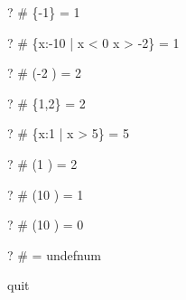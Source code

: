 \begin{zed} \vdash?  \# \{-1\} = 1 \end{zed}
\begin{zed} \vdash?  \# \{x:-10  | x < 0 \land x > -2\} = 1 \end{zed}
\begin{zed} \vdash?  \# (-2 ) = 2 \end{zed}

\begin{zed} \vdash?  \# \{1,2\} = 2 \end{zed}
\begin{zed} \vdash?  \# \{x:1  | x > 5\} = 5 \end{zed}
\begin{zed} \vdash?  \# (1 ) = 2 \end{zed}
\begin{zed} \vdash?  \# (10 ) = 1 \end{zed}
\begin{zed} \vdash?  \# (10 ) = 0 \end{zed}

\begin{zed} \vdash?  \# \nat = undefnum \end{zed}

quit
